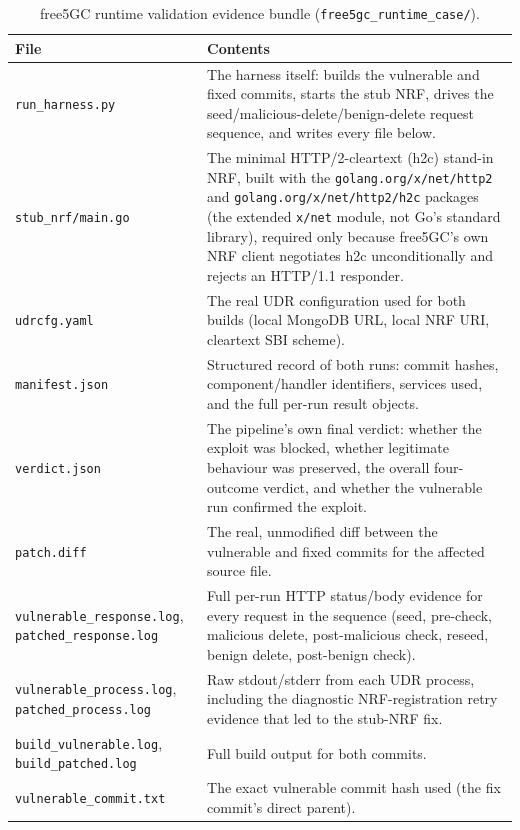\documentclass[12pt,a4paper]{report}
\begin{document}
\begin{table}[H]
\centering
\small
\caption{free5GC runtime validation evidence bundle (\texttt{free5gc\_runtime\_case/}).}
\begin{tabular}{@{}p{4.5cm}p{8.5cm}@{}}
\toprule
\textbf{File} & \textbf{Contents} \\
\midrule
\texttt{run\_harness.py} & The harness itself: builds the vulnerable and fixed commits, starts the stub NRF, drives the seed/malicious-delete/benign-delete request sequence, and writes every file below. \\
\texttt{stub\_nrf/main.go} & The minimal HTTP/2-cleartext (h2c) stand-in NRF, built with the \texttt{golang.org/x/net/http2} and \texttt{golang.org/x/net/http2/h2c} packages (the extended \texttt{x/net} module, not Go's standard library), required only because free5GC's own NRF client negotiates h2c unconditionally and rejects an HTTP/1.1 responder. \\
\texttt{udrcfg.yaml} & The real UDR configuration used for both builds (local MongoDB URL, local NRF URI, cleartext SBI scheme). \\
\texttt{manifest.json} & Structured record of both runs: commit hashes, component/handler identifiers, services used, and the full per-run result objects. \\
\texttt{verdict.json} & The pipeline's own final verdict: whether the exploit was blocked, whether legitimate behaviour was preserved, the overall four-outcome verdict, and whether the vulnerable run confirmed the exploit. \\
\texttt{patch.diff} & The real, unmodified diff between the vulnerable and fixed commits for the affected source file. \\
\texttt{vulnerable\_response.log}, \texttt{patched\_response.log} & Full per-run HTTP status/body evidence for every request in the sequence (seed, pre-check, malicious delete, post-malicious check, reseed, benign delete, post-benign check). \\
\texttt{vulnerable\_process.log}, \texttt{patched\_process.log} & Raw stdout/stderr from each UDR process, including the diagnostic NRF-registration retry evidence that led to the stub-NRF fix. \\
\texttt{build\_vulnerable.log}, \texttt{build\_patched.log} & Full build output for both commits. \\
\texttt{vulnerable\_commit.txt} & The exact vulnerable commit hash used (the fix commit's direct parent). \\
\bottomrule
\end{tabular}
\end{table}
\end{document}
